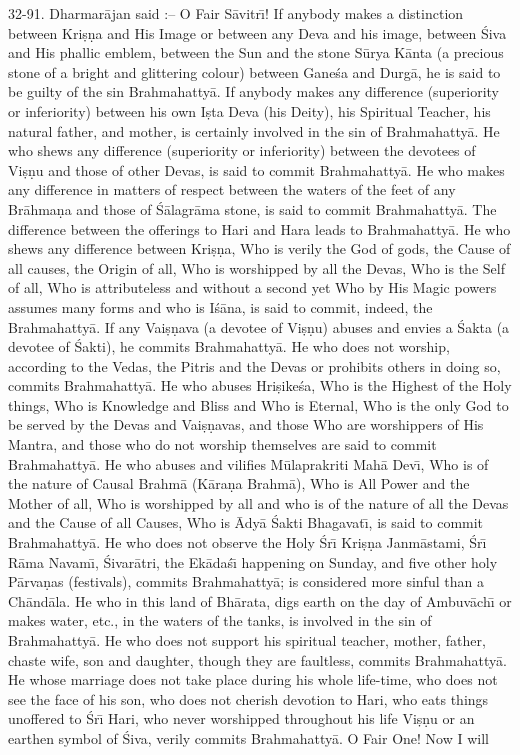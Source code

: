 32-91. Dharmar\=ajan said :-- O Fair S\=avitr\={\i}! If anybody makes a distinction between Kri\d{s}\d{n}a and His Image or between any Deva and his image, between \'Siva and His phallic emblem, between the Sun and the stone S\=urya K\=anta (a precious stone of a bright and glittering colour) between Gane\'sa and Durg\=a, he is said to be guilty of the sin Brahmahatty\=a. If anybody makes any difference (superiority or inferiority) between his own I\d{s}ta Deva (his Deity), his Spiritual Teacher, his natural father, and mother, is certainly involved in the sin of Brahmahatty\=a. He who shews any difference (superiority or inferiority) between the devotees of Vi\d{s}\d{n}u and those of other Devas, is said to commit Brahmahatty\=a. He who makes any difference in matters of respect between the waters of the feet of any Br\=ahma\d{n}a and those of \'S\=alagr\=ama stone, is said to commit Brahmahatty\=a. The difference between the offerings to Hari and Hara leads to Brahmahatty\=a. He who shews any difference between Kri\d{s}\d{n}a, Who is verily the God of gods, the Cause of all causes, the Origin of all, Who is worshipped by all the Devas, Who is the Self of all, Who is attributeless and without a second yet Who by His Magic powers assumes many forms and who is I\'s\=ana, is said to commit, indeed, the Brahmahatty\=a. If any Vai\d{s}\d{n}ava (a devotee of Vi\d{s}\d{n}u) abuses and envies a \'Sakta (a devotee of \'Sakti), he commits Brahmahatty\=a. He who does not worship, according to the Vedas, the Pitris and the Devas or prohibits others in doing so, commits Brahmahatty\=a. He who abuses Hri\d{s}ike\'sa, Who is the Highest of the Holy things, Who is Knowledge and Bliss and Who is Eternal, Who is the only God to be served by the Devas and Vai\d{s}\d{n}avas, and those Who are worshippers of His Mantra, and those who do not worship themselves are said to commit Brahmahatty\=a. He who abuses and vilifies M\=ulaprakriti Mah\=a Dev\={\i}, Who is of the nature of Causal Brahm\=a (K\=ara\d{n}a Brahm\=a), Who is All Power and the Mother of all, Who is worshipped by all and who is of the nature of all the Devas and the Cause of all Causes, Who is \=Ady\=a \'Sakti Bhagavat\={\i}, is said to commit Brahmahatty\=a. He who does not observe the Holy \'Sr\={\i} Kri\d{s}\d{n}a Janm\=astami, \'Sr\={\i} R\=ama Navam\={\i}, \'Sivar\=atri, the Ek\=ada\'s\={\i} happening on Sunday, and five other holy P\=arva\d{n}as (festivals), commits Brahmahatty\=a; is considered more sinful than a Ch\=and\=ala. He who in this land of Bh\=arata, digs earth on the day of Ambuv\=ach\={\i} or makes water, etc., in the waters of the tanks, is involved in the sin of Brahmahatty\=a. He who does not support his spiritual teacher, mother, father, chaste wife, son and daughter, though they are faultless, commits Brahmahatty\=a. He whose marriage does not take place during his whole life-time, who does not see the face of his son, who does not cherish devotion to Hari, who eats things unoffered to \'Sr\={\i} Hari, who never worshipped throughout his life Vi\d{s}\d{n}u or an earthen symbol of \'Siva, verily commits Brahmahatty\=a. O Fair One! Now I will

